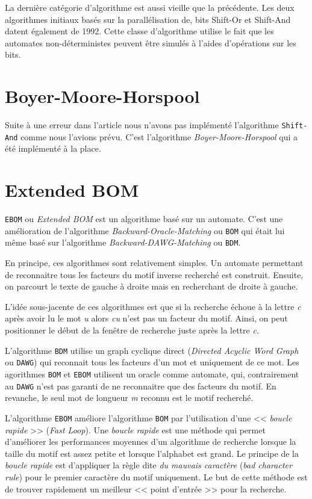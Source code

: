 \documentclass[a4paper,11pt]{article}
\begin{document}
La dernière catégorie d'algorithme est aussi vieille que la précédente. Les deux algorithmes initiaux basés sur la parallélisation de, bits Shift-Or et Shift-And datent également de 1992. Cette classe d'algorithme utilise le fait que les automates non-déterministes peuvent être simulés à l'aides d'opérations sur les bits.

\section{Boyer-Moore-Horspool}

Suite à une erreur dans l'article\cite{DBLP:journals/corr/abs-1012-2547} nous n'avons pas implémenté l'algorithme \texttt{Shift-And} comme nous l'avions prévu. C'est l'algorithme \emph{Boyer-Moore-Horspool} qui a été implémenté à la place.

\section{Extended BOM}

\texttt{EBOM} ou \emph{Extended BOM} est un algorithme basé sur un automate. C'est une amélioration de l'algorithme \emph{Backward-Oracle-Matching} ou \texttt{BOM} qui était lui même basé sur l'algorithme \emph{Backward-DAWG-Matching} ou \texttt{BDM}.

En principe, ces algorithmes sont relativement simples. Un automate permettant de reconnaitre tous les facteurs du motif inverse recherché est construit. Ensuite, on parcourt le texte de gauche à droite mais en recherchant de droite à gauche.

L'idée sous-jacente de ces algorithmes est que si la recherche échoue à la lettre \emph{c} après avoir lu le mot \emph{u} alors \emph{cu} n'est pas un facteur du motif. Ainsi, on peut positionner le début de la fenêtre de recherche juste après la lettre \emph{c}.

L'algorithme \texttt{BDM} utilise un graph cyclique direct (\emph{Directed Acyclic Word Graph} ou \texttt{DAWG}) qui reconnait tous les facteurs d'un mot et uniquement de ce mot. Les agorithmes \texttt{BOM} et \texttt{EBOM} utilisent un oracle comme automate, qui, contrairement au \texttt{DAWG} n'est pas garanti de ne reconnaitre que des facteurs du motif. En revanche, le seul mot de longueur \emph{m} reconnu est le motif recherché.

L'algorithme \texttt{EBOM} améliore l'algorithme \texttt{BOM} par l'utilisation d'une << \emph{boucle rapide} >> (\emph{Fast Loop}). Une \emph{boucle rapide} est une méthode qui permet d'améliorer les performances moyennes d'un algorithme de recherche lorsque la taille du motif est assez petite et lorsque l'alphabet est grand. Le principe de la \emph{boucle rapide} est d'appliquer la règle dite \emph{du mauvais caractère} (\emph{bad character rule}) pour le premier caractère du motif uniquement. Le but de cette méthode est de trouver rapidement un meilleur << point d'entrée >> pour la recherche.
\end{document}
